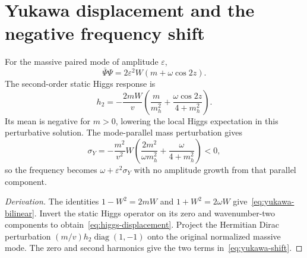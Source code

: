\documentclass[11pt,a4paper,oneside]{book}
\theoremstyle{plain}
\theoremstyle{definition}
\theoremstyle{remark}
\newcommand{\diag}{\operatorname{diag}}
\newcommand{\src}[2]{\cite{#1}}
\begin{document}
\section{Yukawa displacement and the negative frequency shift}
For the massive paired mode of amplitude $\varepsilon$,
\begin{equation}
 \bar\Psi\Psi
 =2\varepsilon^2W(m+\omega\cos2z).
 \label{eq:yukawa-bilinear}
\end{equation}
The second-order static Higgs response is
\begin{equation}
 h_2=-\frac{2mW}{v}
 \left(\frac m{m_h^2}+\frac{\omega\cos2z}{4+m_h^2}\right).
 \label{eq:higgs-displacement}
\end{equation}
Its mean is negative for $m>0$, lowering the local Higgs expectation in this perturbative solution. The mode-parallel mass perturbation gives
\begin{equation}
 \sigma_Y=-\frac{m^2}{v^2}W
 \left(\frac{2m^2}{\omega m_h^2}+\frac\omega{4+m_h^2}\right)<0,
 \label{eq:yukawa-shift}
\end{equation}
so the frequency becomes $\omega+\varepsilon^2\sigma_Y$ with no amplitude growth from that parallel component. \src{R20}{thm:v20v21-displacement,thm:v20v21-shift}

\begin{proof}[Derivation]
The identities $1-W^2=2mW$ and $1+W^2=2\omega W$ give~\eqref{eq:yukawa-bilinear}. Invert the static Higgs operator on its zero and wavenumber-two components to obtain~\eqref{eq:higgs-displacement}. Project the Hermitian Dirac perturbation $(m/v)h_2\diag(1,-1)$ onto the original normalized massive mode. The zero and second harmonics give the two terms in~\eqref{eq:yukawa-shift}.
\end{proof}
\end{document}
